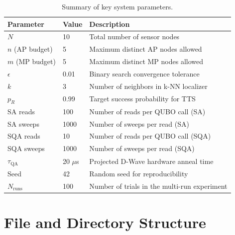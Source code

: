 \documentclass[12pt,a4paper]{article}
\begin{document}
\begin{table}[h!]
\centering
\renewcommand{\arraystretch}{1.3}
\begin{tabular}{@{}lll@{}}
\toprule
\textbf{Parameter} & \textbf{Value} & \textbf{Description} \\
\midrule
$N$              & 10         & Total number of sensor nodes \\
$n$ (AP budget)  & 5          & Maximum distinct AP nodes allowed \\
$m$ (MP budget)  & 5          & Maximum distinct MP nodes allowed \\
$\epsilon$       & 0.01       & Binary search convergence tolerance \\
$k$              & 3          & Number of neighbors in k-NN localizer \\
$p_R$            & 0.99       & Target success probability for TTS \\
SA reads         & 100        & Number of reads per QUBO call (SA) \\
SA sweeps        & 1000       & Number of sweeps per read (SA) \\
SQA reads        & 10         & Number of reads per QUBO call (SQA) \\
SQA sweeps       & 1000       & Number of sweeps per read (SQA) \\
$\tau_{\text{QA}}$ & 20 $\mu$s & Projected D-Wave hardware anneal time \\
Seed             & 42         & Random seed for reproducibility \\
$N_{\text{runs}}$ & 100       & Number of trials in the multi-run experiment \\
\bottomrule
\end{tabular}
\caption{Summary of key system parameters.}
\end{table}

\section{File and Directory Structure}
\end{document}

